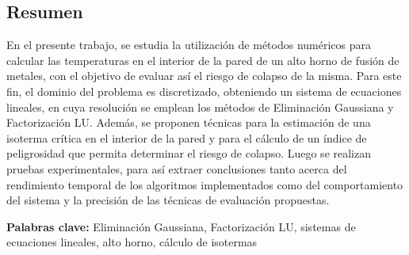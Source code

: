 \documentclass[11pt, a4paper, spanish]{article}
\let\strong\textbf
\theoremstyle{plain}
\theoremstyle{remark}
\theoremstyle{definition}
\begin{document}


\maketitle
\newpage

\begin{addmargin}[4em]{4em}

\section*{\centering Resumen}
  En el presente trabajo, se estudia la utilización de métodos numéricos para calcular las temperaturas en el interior de la pared de un alto horno de fusión de metales, con el objetivo de evaluar así el riesgo de colapso de la misma. Para este fin, el dominio del problema es discretizado, obteniendo un sistema de ecuaciones lineales, en cuya resolución se emplean los métodos de Eliminación Gaussiana y Factorización LU. Además, se proponen técnicas para la estimación de una isoterma crítica en el interior de la pared y para el cálculo de un índice de peligrosidad que permita determinar el riesgo de colapso. Luego se realizan pruebas experimentales, para así extraer conclusiones tanto acerca del rendimiento temporal de los algoritmos implementados como del comportamiento del sistema y la precisión de las técnicas de evaluación propuestas.

\vspace{4em}
\noindent \strong{Palabras clave:} Eliminación Gaussiana, Factorización LU, sistemas de ecuaciones lineales, alto horno, cálculo de isotermas


\end{addmargin}
\clearpage

\tableofcontents
\clearpage


\clearpage

\clearpage

\begin{appendices}
  
  \clearpage
\end{appendices}

\printbibliography[heading=bibintoc]
\end{document}
